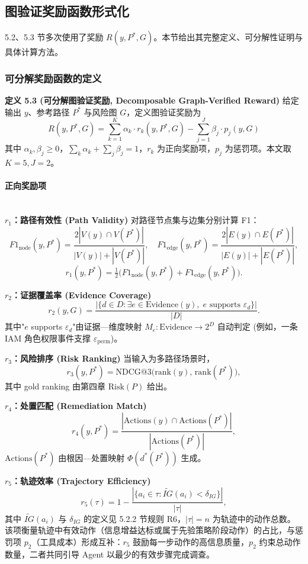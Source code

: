 \documentclass[a4paper,12pt]{ctexart}
\begin{document}
\subsection{图验证奖励函数形式化}

5.2、5.3 节多次使用了奖励 $R(y,P^*,G)$。本节给出其完整定义、可分解性证明与具体计算方法。

\subsubsection{可分解奖励函数的定义}

\textbf{定义 5.3 (可分解图验证奖励, Decomposable Graph-Verified Reward)} 给定输出 $y$、参考路径 $P^*$ 与风险图 $G$，定义图验证奖励为
\[\boxed{\;R(y,P^*,G)=\sum_{k=1}^{K}\alpha_k\cdot r_k(y,P^*,G)-\sum_{j=1}^{J}\beta_j\cdot p_j(y,G)\;}\]
其中 $\alpha_k,\beta_j\geq 0$，$\sum_k\alpha_k+\sum_j\beta_j=1$，$r_k$ 为正向奖励项，$p_j$ 为惩罚项。本文取 $K=5,J=2$。

\paragraph{正向奖励项}\mbox{}\\

\textbf{$r_1$：路径有效性 (Path Validity)}
对路径节点集与边集分别计算 F1：
\[F1_{\mathrm{node}}(y,P^*)=\frac{2|V(y)\cap V(P^*)|}{|V(y)|+|V(P^*)|},\quad F1_{\mathrm{edge}}(y,P^*)=\frac{2|E(y)\cap E(P^*)|}{|E(y)|+|E(P^*)|},\]
\[r_1(y,P^*)=\tfrac{1}{2}\bigl(F1_{\mathrm{node}}(y,P^*)+F1_{\mathrm{edge}}(y,P^*)\bigr).\]

\textbf{$r_2$：证据覆盖率 (Evidence Coverage)}
\[r_2(y,G)=\frac{|\{d\in D:\exists e\in \mathrm{Evidence}(y),\; e\text{ supports }\varepsilon_d\}|}{|D|}.\]
其中"$e$ supports $\varepsilon_d$"由证据—维度映射 $M_e:\mathrm{Evidence}\to 2^{D}$ 自动判定 (例如，一条 IAM 角色权限事件支撑 $\varepsilon_{\mathrm{perm}}$)。

\textbf{$r_3$：风险排序 (Risk Ranking)} 当输入为多路径场景时，
\[r_3(y,P^*)=\mathrm{NDCG@3}\bigl(\mathrm{rank}(y),\,\mathrm{rank}(P^*)\bigr),\]
其中 gold ranking 由第四章 $\mathrm{Risk}(P)$ 给出。

\textbf{$r_4$：处置匹配 (Remediation Match)}
\[r_4(y,P^*)=\frac{|\mathrm{Actions}(y)\cap \mathrm{Actions}(P^*)|}{|\mathrm{Actions}(P^*)|},\]
$\mathrm{Actions}(P^*)$ 由根因—处置映射 $\Phi(d^*(P^*))$ 生成。

\textbf{$r_5$：轨迹效率 (Trajectory Efficiency)}
\[r_5(\tau) = 1 - \frac{|\{a_i \in \tau : \widetilde{IG}(a_i) < \delta_{IG}\}|}{|\tau|},\]
其中 $\widetilde{IG}(a_i)$ 与 $\delta_{IG}$ 的定义见 5.2.2 节规则 R6，$|\tau|=n$ 为轨迹中的动作总数。该项衡量轨迹中有效动作（信息增益达标或属于先验策略阶段动作）的占比，与惩罚项 $p_2$（工具成本）形成互补：$r_5$ 鼓励每一步动作的高信息质量，$p_2$ 约束总动作数量，二者共同引导 Agent 以最少的有效步骤完成调查。
\end{document}
